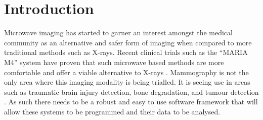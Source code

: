 \section*{Introduction}
Microwave imaging has started to garner an interest amongst the medical community as an alternative and safer form of imaging when compared to more traditional methods such as X-rays. Recent clinical trials such as the “MARIA M4” system have proven that such microwave based methods are more comfortable and offer a viable alternative to X-rays \cite{RN1}. Mammography is not the only area where this imaging modality is being trialled. It is seeing use in areas such as traumatic brain injury detection, bone degradation, and tumour detection \cite{RN2}. As such there needs to be a robust and easy to use software framework that will allow these systems to be programmed and their data to be analysed.